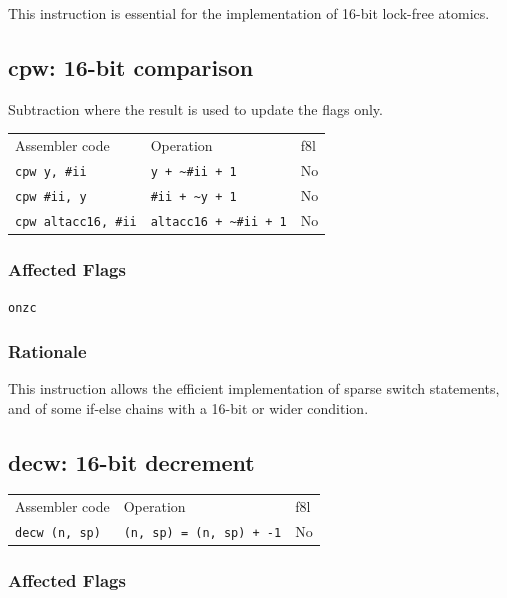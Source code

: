 \documentclass{book}
\begin{document}
This instruction is essential for the implementation of 16-bit lock-free atomics.


\subsection{cpw: 16-bit comparison}

Subtraction where the result is used to update the flags only.

\begin{tabular}{l l l}
Assembler code              & Operation                        & f8l\\
\texttt{cpw y, \#ii}        & \texttt{y + \~{}\#ii + 1}        & No \\
\texttt{cpw \#ii, y}        & \texttt{\#ii + \~{}y + 1}        & No \\
\texttt{cpw altacc16, \#ii} & \texttt{altacc16 + \~{}\#ii + 1} & No \\
\end{tabular}

\subsubsection*{Affected Flags}

\texttt{onzc}

\subsubsection*{Rationale}

This instruction allows the efficient implementation of sparse switch statements, and of some if-else chains with a 16-bit or wider condition.


\subsection{decw: 16-bit decrement}

\begin{tabular}{l l l}
Assembler code        & Operation                       & f8l \\
\texttt{decw (n, sp)} & \texttt{(n, sp) = (n, sp) + -1} & No \\
\end{tabular}

\subsubsection*{Affected Flags}
\end{document}
